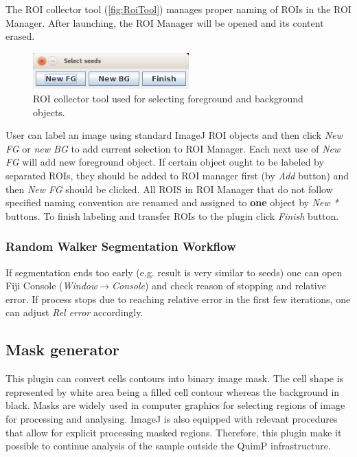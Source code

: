 \documentclass[a4paper,12pt]{article}
\begin{document}
The ROI collector tool (\autoref{fig:RoiTool}) manages proper naming of ROIs in the ROI Manager. After launching, the ROI Manager will be opened and its content erased. 

\begin{figure}[ht]
	\centering
	\includegraphics[width=6cm]{RoiTool.png} 
	\caption{ROI collector tool used for selecting foreground and background objects.}
	\label{fig:RoiTool}
\end{figure}

User can label an image using standard ImageJ ROI objects and then click \textit{New FG} or \textit{new BG} to add current selection to ROI Manager. Each next use of \textit{New FG} will add new foreground object. If certain object ought to be labeled by separated ROIs, they should be added to ROI manager first (by \textit{Add} button) and then \textit{New FG} should be clicked. All ROIS in ROI Manager that do not follow specified naming convention are renamed and assigned to \textbf{one} object by \textit{New *} buttons. To finish labeling and transfer ROIs to the plugin click \textit{Finish} button.

\subsubsection{Random Walker Segmentation Workflow}
If segmentation ends too early (e.g. result is very similar to seeds) one can open Fiji Console (\textit{Window}$\rightarrow$\textit{Console}) and check reason of stopping and relative error. If process stops due to reaching relative error in the first few iterations, one can adjust \textit{Rel error} accordingly.   

\subsection{Mask generator}
\label{sec:MaskGenerator}
This plugin can convert cells contours into binary image mask. The cell shape is represented by white area being a filled cell contour whereas the background in black. Masks are widely used in computer graphics for selecting regions of image for processing and analysing. ImageJ is also equipped with relevant procedures that allow for explicit processing masked regions. Therefore, this plugin make it possible to continue analysis of the sample outside the QuimP infrastructure.
\end{document}
